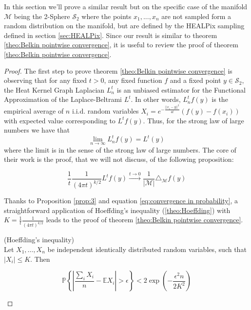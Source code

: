 In this section we'll prove a similar result but on the specific case of the manifold $\mathcal M$ being the 2-Sphere $\mathcal S_2$ where the points $x_1, ..., x_n$ are not sampled form a random distribution on the manifold, but are defined by the HEALPix sampling defined in section \ref{sec:HEALPix}. Since our result is similar to theorem \ref{theo:Belkin pointwise convergence}, it is useful to review the proof of theorem \ref{theo:Belkin pointwise convergence}.
\begin{proof}
The first step to prove theorem \ref{theo:Belkin pointwise convergence} is observing that for any fixed $t>0$, any fixed function $f$ and a fixed point $y\in\mathcal S_2$,  the Heat Kernel Graph Laplacian $L_n^t$ is an unbiased estimator for the Functional Approximation of the Laplace-Beltrami $L^t$. In other words, $L_n^tf(y)$ is the empirical average of $n$ i.i.d. random variables $X_i= e^{-\frac{||x_i-y||^2}{4t}}\left(f(y)-f(x_i)\right)$ with expected value corresponding to $L^tf(y)$. Thus, for the strong law of large numbers we have that
\begin{equation}
\label{eq:convergence in probability}
\lim_{n\to\infty}L_n^tf(y) = L^t(y)
\end{equation}
where the limit is in the sense of the strong law of large numbers.
The core of their work is the proof, that we will not discuss, of the following proposition:

\begin{prop}	
	$$\frac{1}{t}\frac{1}{(4\pi t)^{k/2}} L^tf(y) \xrightarrow{t\to 0 } \frac{1}{|\mathcal M|}\triangle_{\mathcal M}f(y)$$
	\label{prop:3}
\end{prop}

Thanks to Proposition \ref{prop:3} and equation \ref{eq:convergence in probability}, a straightforward application of Hoeffding's inequality (\ref{theo:Hoeffding}) with $K=\frac{1}{t}\frac{1}{(4\pi t)^{k/2}}$ leads to the proof of theorem \ref{theo:Belkin pointwise convergence}.

\begin{prop}(Hoeffding's inequality)\\
	Let \(X_{1}, \ldots, X_{n}\) be independent identically distributed random variables, such that
	\(\left|X_{i}\right| \leqslant K .\) Then
	
	$$
	\mathbb P\left\{\left|\frac{\sum_{i} X_{i}}{n}-\mathbb{E} X_{i}\right|>\epsilon\right\}<2 \exp \left(-\frac{\epsilon^{2} n}{2 K^{2}}\right)
	$$
\end{prop}

\end{proof}


